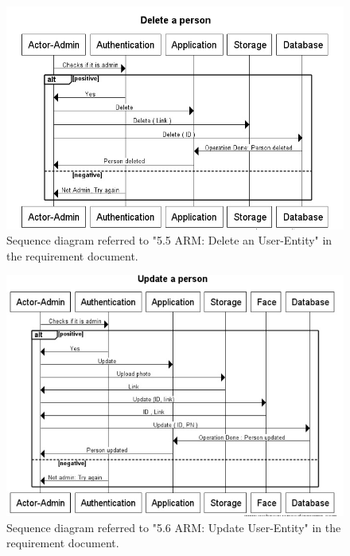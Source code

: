 \documentclass[a4paper,11pt]{article}
\begin{document}
\begin{figure}[ht!]
	\centering
	\includegraphics[width=150mm]{SequenceDiagrams/Delete.jpg}
	\caption{Sequence diagram referred to "5.5 ARM: Delete an User-Entity" in the requirement document. \label{4}}
\end{figure}

\begin{figure}[ht!]
	\centering
	\includegraphics[width=150mm]{SequenceDiagrams/Update.jpg}
	\caption{Sequence diagram referred to "5.6 ARM: Update User-Entity" in the requirement document. \label{5}}
\end{figure}
\end{document}
